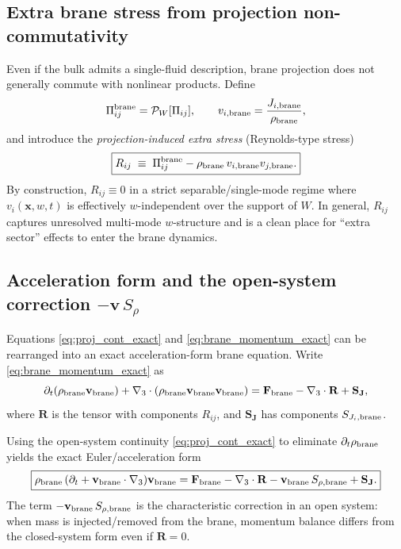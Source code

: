 \documentclass[11pt]{article}
\begin{document}
\subsection{Extra brane stress from projection non-commutativity}
\label{app:extra_stress}

Even if the bulk admits a single-fluid description, brane projection does not
generally commute with nonlinear products. Define
\begin{equation}
\Pi^{\rm brane}_{ij} = \mathcal{P}_W[\Pi_{ij}],
\qquad
v_{i,{\rm brane}}=\frac{J_{i,{\rm brane}}}{\rho_{\rm brane}},
\label{eq:Pi_brane_and_v}
\end{equation}
and introduce the \emph{projection-induced extra stress} (Reynolds-type stress)
\begin{equation}
\boxed{
R_{ij}
\;\equiv\;
\Pi^{\rm brane}_{ij} - \rho_{\rm brane}\, v_{i,{\rm brane}} v_{j,{\rm brane}}.
}
\label{eq:app_Rij_def_alt}
\end{equation}
By construction, $R_{ij}\equiv 0$ in a strict separable/single-mode regime where
$v_i(\mathbf{x},w,t)$ is effectively $w$-independent over the support of $W$.
In general, $R_{ij}$ captures unresolved multi-mode $w$-structure and is a
clean place for ``extra sector'' effects to enter the brane dynamics.

\subsection{Acceleration form and the open-system correction $-\mathbf{v}\,S_\rho$}
\label{app:euler_form_open_system}

Equations \eqref{eq:proj_cont_exact} and \eqref{eq:brane_momentum_exact} can be rearranged
into an exact acceleration-form brane equation. Write \eqref{eq:brane_momentum_exact} as
\begin{equation}
\partial_t(\rho_{\rm brane}\mathbf{v}_{\rm brane}) + \nabla_3\cdot(\rho_{\rm brane}\mathbf{v}_{\rm brane}\mathbf{v}_{\rm brane})
=
\mathbf{F}_{\rm brane} - \nabla_3\cdot \mathbf{R} + \mathbf{S}_{\mathbf{J}},
\label{eq:momentum_with_R}
\end{equation}
where $\mathbf{R}$ is the tensor with components $R_{ij}$, and $\mathbf{S}_{\mathbf{J}}$ has components $S_{J_i,{\rm brane}}$.

Using the open-system continuity \eqref{eq:proj_cont_exact} to eliminate $\partial_t\rho_{\rm brane}$
yields the exact Euler/acceleration form
\begin{equation}
\boxed{
\rho_{\rm brane}\,(\partial_t+\mathbf{v}_{\rm brane}\cdot\nabla_3)\mathbf{v}_{\rm brane}
=
\mathbf{F}_{\rm brane}
-\nabla_3\cdot \mathbf{R}
-\mathbf{v}_{\rm brane}\,S_{\rho,{\rm brane}}
+\mathbf{S}_{\mathbf{J}}.
}
\label{eq:brane_euler_open_system}
\end{equation}
The term $-\mathbf{v}_{\rm brane}\,S_{\rho,{\rm brane}}$ is the characteristic correction
in an open system: when mass is injected/removed from the brane, momentum balance differs
from the closed-system form even if $\mathbf{R}=0$.
\end{document}
